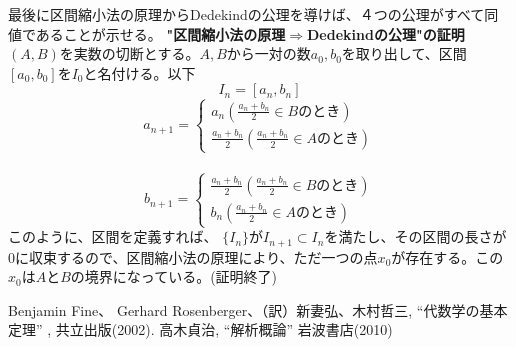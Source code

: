 \documentclass[10pt]{jarticle}
\begin{document}
最後に区間縮小法の原理からDedekindの公理を導けば、４つの公理がすべて同値であることが示せる。
\textbf{"区間縮小法の原理$\Longrightarrow$Dedekindの公理"の証明}\\
$(A,B)$を実数の切断とする。$A,B$から一対の数$a_0,b_0$を取り出して、区間$[a_0,b_0]$を$I_0$と名付ける。以下
\[I_n=[a_n,b_n]\]
\[
  a_{n+1}=\begin{cases}
    a_n　(\frac{a_n+b_n}{2}\in Bのとき)\\
    \frac{a_n+b_n}{2}(\frac{a_n+b_n}{2}\in Aのとき)
  \end{cases}
\]\\
\[
  b_{n+1}=\begin{cases}
     \frac{a_n+b_n}{2}(\frac{a_n+b_n}{2}\in Bのとき)\\
    b_n(\frac{a_n+b_n}{2}\in Aのとき)
  \end{cases}
\]
このように、区間を定義すれば、
$\{I_n\}$が$I_{n+1}\subset I_n$を満たし、その区間の長さが$0$に収束するので、区間縮小法の原理により、ただ一つの点$x_0$が存在する。この$x_0$は$A$と$B$の境界になっている。(証明終了)

\newpage

\begin{thebibliography}{9}
   Benjamin Fine、 Gerhard Rosenberger、（訳）新妻弘、木村哲三,
    ``代数学の基本定理'' ,
    共立出版(2002).
   高木貞治,
    ``解析概論'' 岩波書店(2010)
\end{thebibliography}
\end{document}
